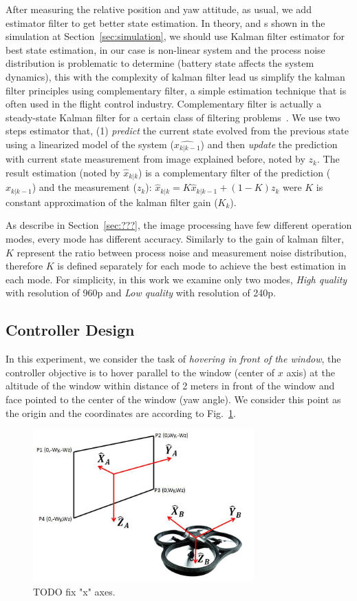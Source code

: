 \documentclass{sig-alternate-ipsn13}
\begin{document}
After measuring the relative position and yaw attitude, as usual, we add estimator filter to get better state estimation. 
In theory, and s shown in the simulation at Section~\ref{sec:simulation}, we should use Kalman filter estimator for best state estimation, in our case is non-linear system and the process noise distribution is problematic to determine (battery state affects the system dynamics), this with the complexity of kalman filter lead us simplify the kalman filter principles using complementary filter, a simple estimation technique that is often used in the flight control industry.
Complementary filter is actually a steady-state Kalman filter for a certain class of filtering problems~\cite{complementaryVSKalman}.
We use two steps estimator that, (1) \textit{predict} the current state evolved from the previous state using a linearized model of the system ($\hat{x_{k|k-1}}$) and then \textit{update} the prediction with current state measurement from image explained before, noted by $z_k$.
The result estimation (noted by $\hat{x}_{k|k}$) is a complementary filter of the prediction ($\hat{x}_{k|k-1}$) and the measurement ($z_k$):
$ \hat{x}_{k|k} = K \hat{x}_{k|k-1} + (1-K) z_k $ were $K$ is constant approximation of the kalman filter gain ($K_k$).

As describe in Section~\ref{sec:???}, the image processing have few different operation modes, every mode has different accuracy.
Similarly to the gain of kalman filter, $K$ represent the ratio between process noise and measurement noise distribution, therefore $K$ is defined separately for each mode to achieve the best estimation in each mode.
For simplicity, in this work we examine only two modes, \textit{High quality} with resolution of 960p and \textit{Low quality} with resolution of 240p.

\subsection{Controller Design}

In this experiment, we consider the task of \textit{hovering in front of the window}, the controller objective is to hover parallel to the window (center of $x$ axis) at the altitude of the window within distance of 2 meters in front of the window and face pointed to the center of the window (yaw angle).
We consider this point as the origin and the coordinates are according to Fig.~\ref{fig:axis}.

\begin{figure}[htbp]
    \centerline{\includegraphics[width=85mm]{axes_fron_hanoch.jpg}}
    \caption{TODO fix "x" axes.}
    \label{fig:axis}
\end{figure}
\end{document}
